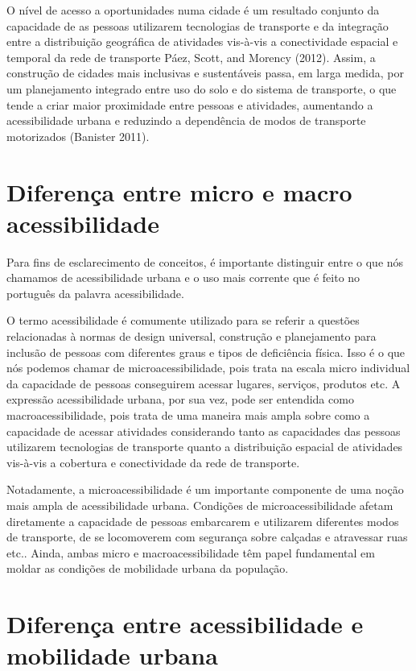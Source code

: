 \documentclass[
  letterpaper,
  DIV=11,
  numbers=noendperiod]{scrreprt}
\begin{document}
O nível de acesso a oportunidades numa cidade é um resultado conjunto da
capacidade de as pessoas utilizarem tecnologias de transporte e da
integração entre a distribuição geográfica de atividades vis-à-vis a
conectividade espacial e temporal da rede de transporte Páez, Scott, and
Morency (2012). Assim, a construção de cidades mais inclusivas e
sustentáveis passa, em larga medida, por um planejamento integrado entre
uso do solo e do sistema de transporte, o que tende a criar maior
proximidade entre pessoas e atividades, aumentando a acessibilidade
urbana e reduzindo a dependência de modos de transporte motorizados
(Banister 2011).

\hypertarget{diferenuxe7a-entre-micro-e-macro-acessibilidade}{%
\section{Diferença entre micro e macro
acessibilidade}\label{diferenuxe7a-entre-micro-e-macro-acessibilidade}}

Para fins de esclarecimento de conceitos, é importante distinguir entre
o que nós chamamos de acessibilidade urbana e o uso mais corrente que é
feito no português da palavra acessibilidade.

O termo acessibilidade é comumente utilizado para se referir a questões
relacionadas à normas de design universal, construção e planejamento
para inclusão de pessoas com diferentes graus e tipos de deficiência
física. Isso é o que nós podemos chamar de microacessibilidade, pois
trata na escala micro individual da capacidade de pessoas conseguirem
acessar lugares, serviços, produtos etc. A expressão acessibilidade
urbana, por sua vez, pode ser entendida como macroacessibilidade, pois
trata de uma maneira mais ampla sobre como a capacidade de acessar
atividades considerando tanto as capacidades das pessoas utilizarem
tecnologias de transporte quanto a distribuição espacial de atividades
vis-à-vis a cobertura e conectividade da rede de transporte.

Notadamente, a microacessibilidade é um importante componente de uma
noção mais ampla de acessibilidade urbana. Condições de
microacessibilidade afetam diretamente a capacidade de pessoas
embarcarem e utilizarem diferentes modos de transporte, de se
locomoverem com segurança sobre calçadas e atravessar ruas etc.. Ainda,
ambas micro e macroacessibilidade têm papel fundamental em moldar as
condições de mobilidade urbana da população.

\hypertarget{diferenuxe7a-entre-acessibilidade-e-mobilidade-urbana}{%
\section{Diferença entre acessibilidade e mobilidade
urbana}\label{diferenuxe7a-entre-acessibilidade-e-mobilidade-urbana}}
\end{document}
